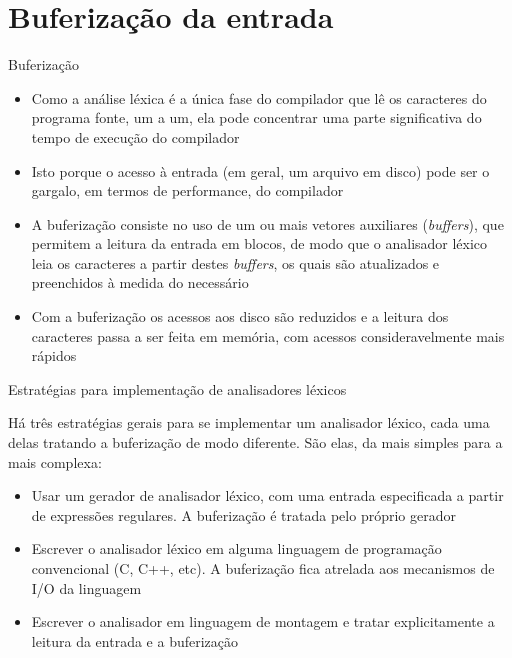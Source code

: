 \section{Buferização da entrada}

\begin{frame}[fragile]{Buferização}

    \begin{itemize}
        \item Como a análise léxica é a única fase do compilador que lê os caracteres do programa fonte, um a um, ela pode concentrar uma parte significativa
            do tempo de execução do compilador

        \item Isto porque o acesso à entrada (em geral, um arquivo em disco) pode ser o gargalo, em termos de performance, do compilador

        \item A buferização consiste no uso de um ou mais vetores auxiliares (\textit{buffers}), que permitem a leitura da entrada em blocos, de modo que o analisador léxico
            leia os caracteres a partir destes \textit{buffers}, os quais são atualizados e preenchidos à medida do necessário

        \item Com a buferização os acessos aos disco são reduzidos e a leitura dos caracteres passa a ser feita em memória, com acessos consideravelmente mais
            rápidos
    \end{itemize}

\end{frame}
\begin{frame}[fragile]{Estratégias para implementação de analisadores léxicos}

    Há três estratégias gerais para se implementar um analisador léxico, cada uma delas tratando a buferização de modo diferente. São elas, da mais
    simples para a mais complexa:
    \begin{itemize}
        \item Usar um gerador de analisador léxico, com uma entrada especificada a partir de expressões regulares. A buferização é tratada pelo próprio
            gerador

        \item Escrever o analisador léxico em alguma linguagem de programação convencional (C, C++, etc). A buferização fica atrelada aos mecanismos de I/O da linguagem

        \item Escrever o analisador em linguagem de montagem e tratar explicitamente a leitura da entrada e a buferização
    \end{itemize}

\end{frame}

